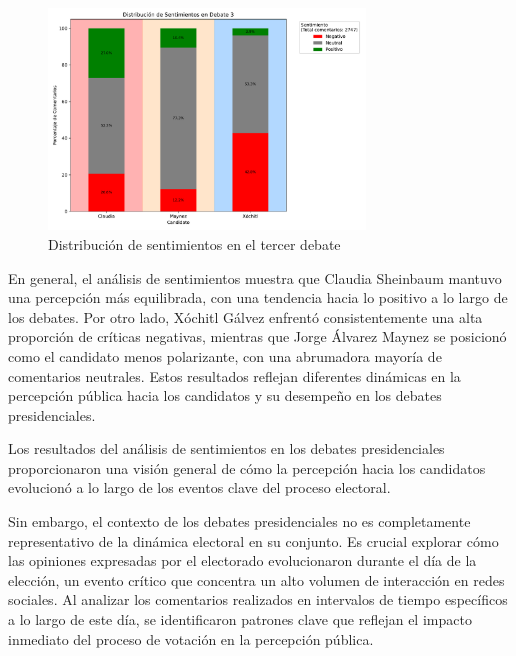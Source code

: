 \documentclass[10pt, a4paper]{article}
\begin{document}
	\begin{figure}[h!] %
		\centering
		\includegraphics[width=0.75\textwidth]{sA_debate3.pdf} %
		\caption{Distribución de sentimientos en el tercer debate} %
		\label{fig:sA_debat3} %
	\end{figure}
	
	En general, el análisis de sentimientos muestra que Claudia Sheinbaum mantuvo una percepción más equilibrada, con una tendencia hacia lo positivo a lo largo de los debates. Por otro lado, Xóchitl Gálvez enfrentó consistentemente una alta proporción de críticas negativas, mientras que Jorge Álvarez Maynez se posicionó como el candidato menos polarizante, con una abrumadora mayoría de comentarios neutrales. Estos resultados reflejan diferentes dinámicas en la percepción pública hacia los candidatos y su desempeño en los debates presidenciales.
	
	Los resultados del análisis de sentimientos en los debates presidenciales proporcionaron una visión general de cómo la percepción hacia los candidatos evolucionó a lo largo de los eventos clave del proceso electoral. 
	
	Sin embargo, el contexto de los debates presidenciales no es completamente representativo de la dinámica electoral en su conjunto. Es crucial explorar cómo las opiniones expresadas por el electorado evolucionaron durante el día de la elección, un evento crítico que concentra un alto volumen de interacción en redes sociales. Al analizar los comentarios realizados en intervalos de tiempo específicos a lo largo de este día, se identificaron patrones clave que reflejan el impacto inmediato del proceso de votación en la percepción pública.
	
\end{document}
